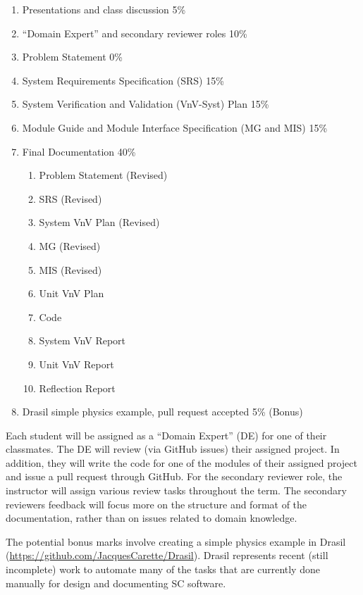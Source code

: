 \documentclass[12pt]{article}
\begin{document}
\begin {enumerate}

\item Presentations and class discussion 5\%

\item ``Domain Expert'' and secondary reviewer roles 10\%

\item Problem Statement 0\%

\item System Requirements Specification (SRS) 15\%

\item System Verification and Validation (VnV-Syst) Plan 15\%

\item Module Guide and Module Interface Specification (MG and MIS) 15\%

\item Final Documentation 40\%
\begin{enumerate}
\item Problem Statement (Revised)
\item SRS (Revised)
\item System VnV Plan (Revised)
\item MG (Revised)
\item MIS (Revised)
\item Unit VnV Plan
\item Code
\item System VnV Report
\item Unit VnV Report
\item Reflection Report
\end{enumerate}

\item Drasil simple physics example, pull request accepted 5\% (Bonus)

\end {enumerate}

Each student will be assigned as a ``Domain Expert'' (DE) for one of their
classmates.  The DE will review (via GitHub issues) their assigned project.  In
addition, they will write the code for one of the modules of their assigned
project and issue a pull request through GitHub.  For the secondary reviewer
role, the instructor will assign various review tasks throughout the term.  The
secondary reviewers feedback will focus more on the structure and format of the
documentation, rather than on issues related to domain knowledge.

The potential bonus marks involve creating a simple physics example in Drasil
(\url{https://github.com/JacquesCarette/Drasil}).  Drasil represents recent
(still incomplete) work to automate many of the tasks that are currently done
manually for design and documenting SC software.
\end{document}
